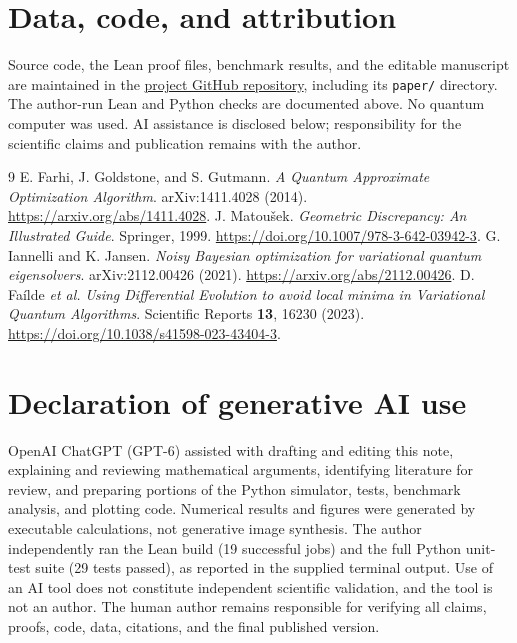 \documentclass[10pt,a4paper]{article}
\begin{document}
\section*{Data, code, and attribution}
Source code, the Lean proof files, benchmark results, and the editable manuscript are maintained in the \href{https://github.com/kummahiih/variational-quantum-algorithms}{project GitHub repository}, including its \texttt{paper/} directory. The author-run Lean and Python checks are documented above. No quantum computer was used. AI assistance is disclosed below; responsibility for the scientific claims and publication remains with the author.

\begin{thebibliography}{9}
 E. Farhi, J. Goldstone, and S. Gutmann. \emph{A Quantum Approximate Optimization Algorithm}. arXiv:1411.4028 (2014). \url{https://arxiv.org/abs/1411.4028}.
 J. Matou\v{s}ek. \emph{Geometric Discrepancy: An Illustrated Guide}. Springer, 1999. \url{https://doi.org/10.1007/978-3-642-03942-3}.
 G. Iannelli and K. Jansen. \emph{Noisy Bayesian optimization for variational quantum eigensolvers}. arXiv:2112.00426 (2021). \url{https://arxiv.org/abs/2112.00426}.
 D. Fa\'{i}lde \emph{et al.} \emph{Using Differential Evolution to avoid local minima in Variational Quantum Algorithms}. Scientific Reports \textbf{13}, 16230 (2023). \url{https://doi.org/10.1038/s41598-023-43404-3}.
\end{thebibliography}

\section*{Declaration of generative AI use}
OpenAI ChatGPT (GPT-6) assisted with drafting and editing this note, explaining and reviewing mathematical arguments, identifying literature for review, and preparing portions of the Python simulator, tests, benchmark analysis, and plotting code. Numerical results and figures were generated by executable calculations, not generative image synthesis. The author independently ran the Lean build (19 successful jobs) and the full Python unit-test suite (29 tests passed), as reported in the supplied terminal output. Use of an AI tool does not constitute independent scientific validation, and the tool is not an author. The human author remains responsible for verifying all claims, proofs, code, data, citations, and the final published version.
\end{document}
